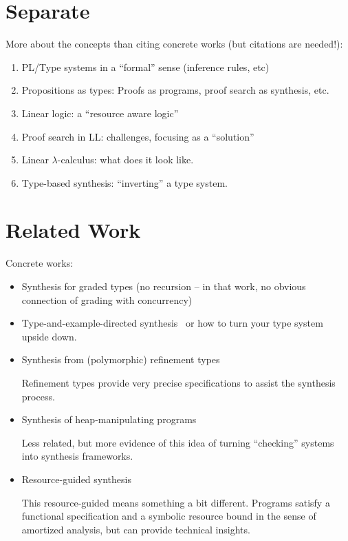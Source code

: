 \documentclass{llncs}
\begin{document}
\section{Separate}

More about the concepts than citing concrete works (but citations are
needed!):
\begin{enumerate}
\item PL/Type systems in a ``formal'' sense (inference rules, etc)
\item Propositions as types: Proofs as programs, proof search as
  synthesis, etc.
\item Linear logic: a ``resource aware logic''
\item Proof search in LL: challenges, focusing as a ``solution''
\item Linear $\lambda$-calculus: what does it look like.
\item Type-based synthesis: ``inverting'' a type system.
\end{enumerate}

\section{Related Work}

Concrete works:
\begin{itemize}
\item Synthesis for graded types (no recursion   -- in that work, no
  obvious connection of grading with
  concurrency)~\cite{DBLP:conf/lopstr/HughesO20}

\item Type-and-example-directed
  synthesis~\cite{DBLP:conf/pldi/OseraZ15,DBLP:conf/popl/FrankleOWZ16}
  or how to turn your type system upside down.
  
\item Synthesis from (polymorphic) refinement types~\cite{DBLP:conf/pldi/PolikarpovaKS16}

Refinement types provide very precise specifications to assist the
synthesis process.

\item Synthesis of heap-manipulating
  programs~\cite{DBLP:journals/pacmpl/PolikarpovaS19}

Less related, but more evidence of this idea of turning ``checking''
systems into synthesis frameworks.

\item Resource-guided synthesis \cite{DBLP:conf/pldi/KnothWP019}

This resource-guided means something a bit different. Programs satisfy
a functional specification and a symbolic resource bound in the sense
of amortized analysis, but can provide technical insights.

\end{itemize}
\end{document}
